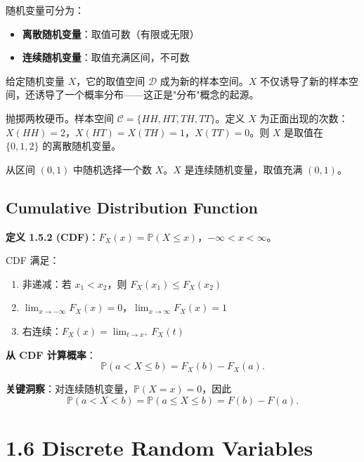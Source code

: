 随机变量可分为：
\begin{itemize}
    \item \textbf{离散随机变量}：取值可数（有限或无限）
    \item \textbf{连续随机变量}：取值充满区间，不可数
\end{itemize}

给定随机变量 $X$，它的取值空间 $\mathcal{D}$ 成为新的样本空间。$X$ 不仅诱导了新的样本空间，还诱导了一个概率分布——这正是"分布"概念的起源。

\begin{example}[硬币投掷]\label{ex:rv-coin-ch1}
抛掷两枚硬币。样本空间 $\mathcal{C} = \{HH, HT, TH, TT\}$。定义 $X$ 为正面出现的次数：$X(HH) = 2$，$X(HT) = X(TH) = 1$，$X(TT) = 0$。则 $X$ 是取值在 $\{0, 1, 2\}$ 的离散随机变量。
\end{example}

\begin{example}[均匀选择]\label{ex:rv-uniform-ch1}
从区间 $(0, 1)$ 中随机选择一个数 $X$。$X$ 是连续随机变量，取值充满 $(0, 1)$。
\end{example}

\subsection{Cumulative Distribution Function}

\begin{remark}
\textbf{定义 1.5.2 (CDF)}：$F_X(x) = \mathbb{P}(X \leq x)$，$-\infty < x < \infty$。

CDF 满足：
\begin{enumerate}
    \item 非递减：若 $x_1 < x_2$，则 $F_X(x_1) \leq F_X(x_2)$
    \item $\lim_{x \to -\infty} F_X(x) = 0$，$\lim_{x \to \infty} F_X(x) = 1$
    \item 右连续：$F_X(x) = \lim_{t \to x^+} F_X(t)$
\end{enumerate}
\end{remark}

\textbf{从 CDF 计算概率}：
\[
\mathbb{P}(a < X \leq b) = F_X(b) - F_X(a).
\tag{1.5.1}\label{eq:cdf-prob-ch1}
\]

\textbf{关键洞察}：对连续随机变量，$\mathbb{P}(X = x) = 0$，因此
\[
\mathbb{P}(a < X < b) = \mathbb{P}(a \leq X \leq b) = F(b) - F(a).
\tag{1.5.2}\label{eq:continuous-point-prob-ch1}
\]

\section{1.6 Discrete Random Variables}\label{sec:1.6}

